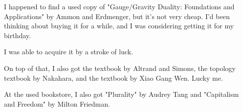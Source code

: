 \documentclass[uplatex]{jsarticle}
\begin{document}
I happened to find a used copy of "Gauge/Gravity Duality: Foundations and Applications" by Ammon and Erdmenger, but it's not very cheap. I'd been thinking about buying it for a while, and I was considering getting it for my birthday.

I was able to acquire it by a stroke of luck.

On top of that, I also got the textbook by Altrand and Simons, the topology textbook by Nakahara, and the textbook by Xiao Gang Wen. Lucky me.

At the used bookstore, I also got "Plurality" by Audrey Tang and "Capitalism and Freedom" by Milton Friedman.
\end{document}
